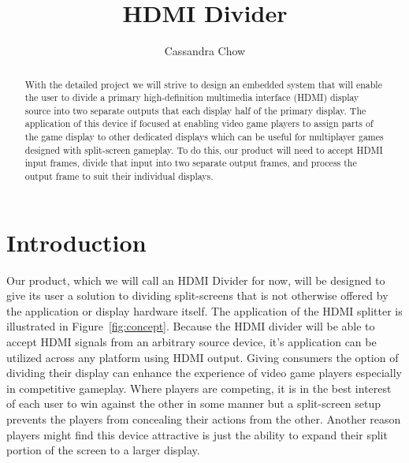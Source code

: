 \documentclass[12pt]{article}
\title{HDMI Divider}
\author{Cassandra Chow}
\begin{document}
\maketitle

\begin{abstract}
With the detailed project we will strive to design an embedded system that will enable the user to divide a primary high-definition multimedia interface (HDMI) display source into two separate outputs that each display half of the primary display. The application of this device if focused at enabling video game players to assign parts of the game display to other dedicated displays which can be useful for multiplayer games designed with split-screen gameplay. To do this, our product will need to accept HDMI input frames, divide that input into two separate output frames, and process the output frame to suit their individual displays. 
\end{abstract}

\pagebreak
\tableofcontents

\pagebreak
\section{Introduction}

Our product, which we will call an HDMI Divider for now, will be designed to give its user a solution to dividing split-screens that is not otherwise offered by the application or display hardware itself. The application of the HDMI splitter is illustrated in Figure~\ref{fig:concept}. Because the HDMI divider will be able to accept HDMI signals from an arbitrary source device, it's application can be utilized across any platform using HDMI output. Giving consumers the option of dividing their display can enhance the experience of video game players especially in competitive gameplay. Where players are competing, it is in the best interest of each user to win against the other in some manner but a split-screen setup prevents the players from concealing their actions from the other. Another reason players might find this device attractive is just the ability to expand their split portion of the screen to a larger display.
\end{document}

